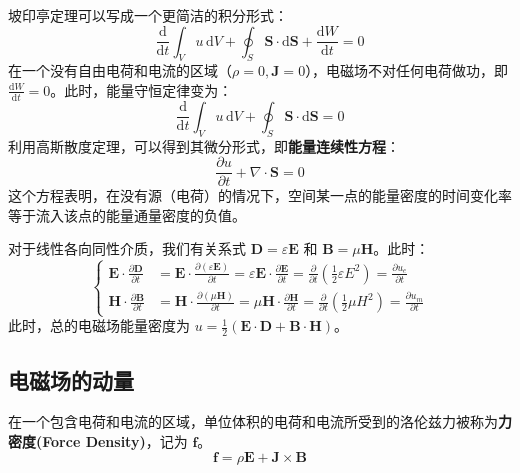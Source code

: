 \documentclass[fontset=none]{ctexart}
\begin{document}
坡印亭定理可以写成一个更简洁的积分形式：
\begin{equation}
    \frac{\mathrm{d}}{\mathrm{d}t}\int_V u \, \mathrm{d}V + \oint_S \bm{S} \cdot \mathrm{d}\bm{S} + \frac{\mathrm{d}W}{\mathrm{d}t} = 0
\end{equation}
在一个没有自由电荷和电流的区域（$\rho=0, \bm{J}=0$），电磁场不对任何电荷做功，即 $\frac{\mathrm{d}W}{\mathrm{d}t} = 0$。此时，能量守恒定律变为：
\begin{equation}
    \frac{\mathrm{d}}{\mathrm{d}t}\int_V u \, \mathrm{d}V + \oint_S \bm{S} \cdot \mathrm{d}\bm{S} = 0
\end{equation}
利用高斯散度定理，可以得到其微分形式，即\textbf{能量连续性方程}：
\begin{equation}
    \frac{\partial u}{\partial t} + \nabla \cdot \bm{S} = 0
\end{equation}
这个方程表明，在没有源（电荷）的情况下，空间某一点的能量密度的时间变化率等于流入该点的能量通量密度的负值。

对于线性各向同性介质，我们有关系式 $\bm{D} = \varepsilon \bm{E}$ 和 $\bm{B} = \mu \bm{H}$。此时：
\begin{equation}
    \left\{
    \begin{aligned}
    \bm{E} \cdot \frac{\partial \bm{D}}{\partial t} &= \bm{E} \cdot \frac{\partial (\varepsilon \bm{E})}{\partial t} = \varepsilon \bm{E} \cdot \frac{\partial \bm{E}}{\partial t} = \frac{\partial}{\partial t}\left(\frac{1}{2}\varepsilon E^2\right) = \frac{\partial u_e}{\partial t} \\
    \bm{H} \cdot \frac{\partial \bm{B}}{\partial t} &= \bm{H} \cdot \frac{\partial (\mu \bm{H})}{\partial t} = \mu \bm{H} \cdot \frac{\partial \bm{H}}{\partial t} = \frac{\partial}{\partial t}\left(\frac{1}{2}\mu H^2\right) = \frac{\partial u_m}{\partial t}
    \end{aligned}
    \right.
\end{equation}
此时，总的电磁场能量密度为 $u = \frac{1}{2}(\bm{E}\cdot\bm{D} + \bm{B}\cdot\bm{H})$。

\subsection{电磁场的动量}

\begin{definition}[电磁场力密度]
在一个包含电荷和电流的区域，单位体积的电荷和电流所受到的洛伦兹力被称为\textbf{力密度(Force Density)}，记为 $\bm{f}$。
\begin{equation}
    \bm{f} = \rho \bm{E} + \bm{J} \times \bm{B}
\end{equation}
\end{definition}
\end{document}
